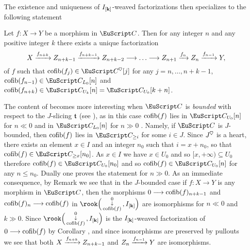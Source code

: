  The existence and uniqueness of $I_{[\mathbf{k}]}$-weaved factorizations then specializes to the following statement
\begin{proposition}\label{prop.first-tower}
Let $f\colon X\to Y$ be a morphism in $\C$. Then for any integer $n$ and any positive integer $k$ there exists a unique factorization
\[
X \xto{f_{n+k}} Z_{n+k-1} \xto{f_{n+k-1}}Z_{n+k-2}\to\dots\to Z_{n+1} \xto{f_{n}} Z_{n} \xto{f_{n-1}} Y,
\]
of $f$ such that
$\cofib(f_j)\in \C^\heart[j]$ for any $j=n,\dots,n+k-1$,  $\cofib(f_{n-1})\in \C_{L_0}[n]$  and $\cofib(f_{n+k})\in \C_{U_k}[n]=\C_{U_0}[k+n]$.
\end{proposition}
The content of \aprop{} becomes more interesting when $\C$ is \emph{bounded} with respect to the $J$-slicing $\mathfrak{t}$ (see \adef{}), as in this case $\operatorname{cofib}(f)$ lies in $\C_{U_0}[n]$ for $n\ll 0$ and in $\C_{L_0}[n]$ for $n\gg0$ . Namely, if $\C$ is $J$-bounded, then $\operatorname{cofib}(f)$ lies in $\C_{\geq i}$ for some $i\in J$. Since $J^\heart$ is a heart, there exists an element $x\in I$ and an integer $n_0$ such that $i=x+n_0$, so that $\cofib(f)\in \C_{\geq x}[n_0]$. As $x\in I$ we have $x\in U_0$ and so $[x,+\infty)\subseteq U_0$ therefore $\cofib(f)\in \C_{U_0}[n_0]$ and so $\cofib(f)\in \C_{U_0}[n]$ for any $n\leq n_0$. Dually one proves the statement for $n\gg0$. 
 As an immediate consequence, by Remark  we see that in the $J$-bounded case
if $f\colon X\to Y$ is any morphism in $\C$, then  
 the morphisms $0 \longrightarrow \operatorname{cofib}(f)_{n+k-1}$ and $\operatorname{cofib}(f)_{n} \longrightarrow \operatorname{cofib}(f)$ in $\rook\Big(\varnobkt{0}{\cofib(f)},I_{\ordered{k}}\Big)$ are isomorphisms for $n\ll 0$ and $k \gg 0$. Since $\rook\Big(\varnobkt{0}{\cofib(f)},I_{\ordered{k}}\Big)$ is the $I_{[\mathbf{k}]}$-weaved factorization of $0\longrightarrow \operatorname{cofib}(f)$ by Corollary , and since isomorphisms are preserved by pullouts we see that both $X \xrightarrow{f_{n+k}} Z_{n+k-1} $ and $Z_{n} \xrightarrow{f_{n-1}} Y$ are isomorphisms.
 
